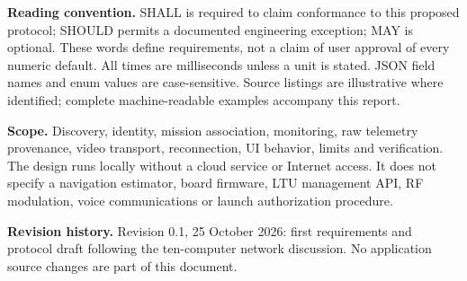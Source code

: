 \textbf{Reading convention.} SHALL is required to claim conformance to this
proposed protocol; SHOULD permits a documented engineering exception; MAY is
optional. These words define requirements, not a claim of user approval of every
numeric default. All times are milliseconds unless a unit is stated. JSON field
names and enum values are case-sensitive. Source listings are illustrative where
identified; complete machine-readable examples accompany this report.

\textbf{Scope.} Discovery, identity, mission association, monitoring, raw telemetry
provenance, video transport, reconnection, UI behavior, limits and verification.
The design runs locally without a cloud service or Internet access. It does not
specify a navigation estimator, board firmware, LTU management API, RF modulation,
voice communications or launch authorization procedure.

\textbf{Revision history.} Revision 0.1, 25 October 2026: first requirements and
protocol draft following the ten-computer network discussion. No application
source changes are part of this document.
